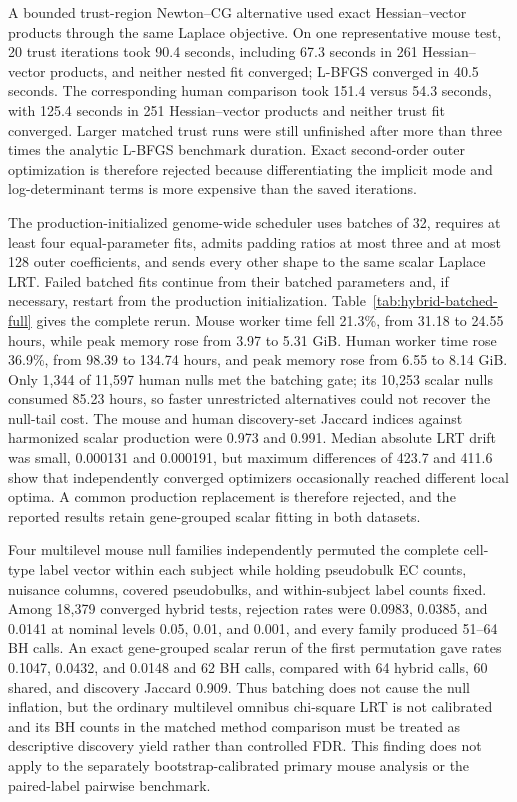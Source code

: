 \documentclass[11pt]{article}
\begin{document}
A bounded trust-region Newton--CG alternative used exact Hessian--vector products through the same Laplace objective. On one representative mouse test, 20 trust iterations took 90.4 seconds, including 67.3 seconds in 261 Hessian--vector products, and neither nested fit converged; L-BFGS converged in 40.5 seconds. The corresponding human comparison took 151.4 versus 54.3 seconds, with 125.4 seconds in 251 Hessian--vector products and neither trust fit converged. Larger matched trust runs were still unfinished after more than three times the analytic L-BFGS benchmark duration. Exact second-order outer optimization is therefore rejected because differentiating the implicit mode and log-determinant terms is more expensive than the saved iterations.

The production-initialized genome-wide scheduler uses batches of 32, requires at least four equal-parameter fits, admits padding ratios at most three and at most 128 outer coefficients, and sends every other shape to the same scalar Laplace LRT. Failed batched fits continue from their batched parameters and, if necessary, restart from the production initialization. Table~\ref{tab:hybrid-batched-full} gives the complete rerun. Mouse worker time fell 21.3\%, from 31.18 to 24.55 hours, while peak memory rose from 3.97 to 5.31 GiB. Human worker time rose 36.9\%, from 98.39 to 134.74 hours, and peak memory rose from 6.55 to 8.14 GiB. Only 1,344 of 11,597 human nulls met the batching gate; its 10,253 scalar nulls consumed 85.23 hours, so faster unrestricted alternatives could not recover the null-tail cost. The mouse and human discovery-set Jaccard indices against harmonized scalar production were 0.973 and 0.991. Median absolute LRT drift was small, 0.000131 and 0.000191, but maximum differences of 423.7 and 411.6 show that independently converged optimizers occasionally reached different local optima. A common production replacement is therefore rejected, and the reported results retain gene-grouped scalar fitting in both datasets.

Four multilevel mouse null families independently permuted the complete cell-type label vector within each subject while holding pseudobulk EC counts, nuisance columns, covered pseudobulks, and within-subject label counts fixed. Among 18,379 converged hybrid tests, rejection rates were 0.0983, 0.0385, and 0.0141 at nominal levels 0.05, 0.01, and 0.001, and every family produced 51--64 BH calls. An exact gene-grouped scalar rerun of the first permutation gave rates 0.1047, 0.0432, and 0.0148 and 62 BH calls, compared with 64 hybrid calls, 60 shared, and discovery Jaccard 0.909. Thus batching does not cause the null inflation, but the ordinary multilevel omnibus chi-square LRT is not calibrated and its BH counts in the matched method comparison must be treated as descriptive discovery yield rather than controlled FDR. This finding does not apply to the separately bootstrap-calibrated primary mouse analysis or the paired-label pairwise benchmark.
\end{document}
